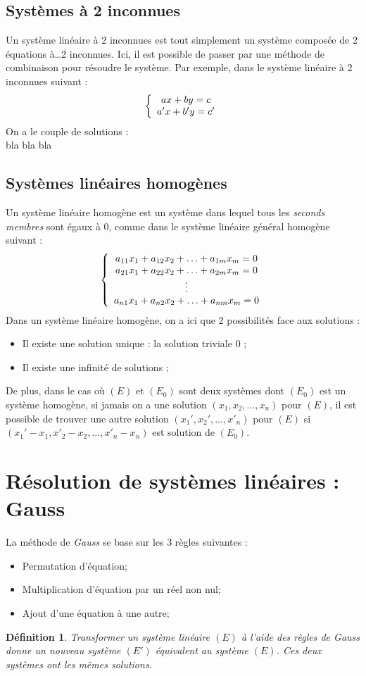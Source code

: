 \documentclass{report}
\newtheorem{mydef}{Définition}
\begin{document}
\subsection{Systèmes à 2 inconnues}
Un système linéaire à 2 inconnues est tout simplement un système composée de 2 équations à\ldots 2 inconnues.
Ici, il est possible de passer par une méthode de combinaison pour résoudre le système.
Par exemple, dans le système linéaire à 2 inconnues suivant :
\[
\left\{
\begin{array}{c c c}
	ax+by = c\\
	a'x+b'y = c'
\end{array}
\right.
\]
On a le couple de solutions :\\
bla bla bla

\subsection{Systèmes linéaires homogènes}
Un système linéaire homogène est un système dans lequel tous les \emph{seconds membres} sont égaux à 0, comme dans le système linéaire général homogène suivant :
\[
\left\{
\begin{array}{c c c}
	a_{11} x_1 + a_{12} x_2 + \ldots + a_{1m} x_m = 0 \\
	a_{21} x_1 + a_{22} x_2 + \ldots + a_{2m} x_m = 0 \\
	\vdots \\
	a_{n1} x_1 + a_{n2} x_2 + \ldots + a_{nm} x_m = 0
\end{array}
\right.
\]
Dans un système linéaire homogène, on a ici que 2 possibilités face aux solutions :
\begin{itemize}
	\item{Il existe une solution unique : la solution triviale 0 ;}
	\item{Il existe une infinité de solutions ;}
\end{itemize}
De plus, dans le cas où $(E)$ et $(E_0)$ sont deux systèmes dont $(E_0)$ est un système homogène, si jamais on a une solution $(x_1,x_2,\ldots,x_n)$ pour $(E)$, il est possible de trouver une autre solution $(x_1',x_2',\ldots,x'_n)$ pour $(E)$ si $(x_1'-x_1, x'_2-x_2,\ldots,x'_n-x_n)$ est solution de $(E_0)$.

\section{Résolution de systèmes linéaires : Gauss}\label{Gauss}
La méthode de \emph{Gauss} se base sur les 3 règles suivantes :
\begin{itemize}
	\item{Permutation d'équation;}
	\item{Multiplication d'équation par un réel non nul;}
	\item{Ajout d'une équation à une autre;}
\end{itemize}
\begin{mydef}
Transformer un système linéaire $(E)$ à l'aide des règles de Gauss donne un nouveau système $(E')$ équivalent au système $(E)$. Ces deux systèmes ont les mêmes solutions.
\end{mydef}
\end{document}

